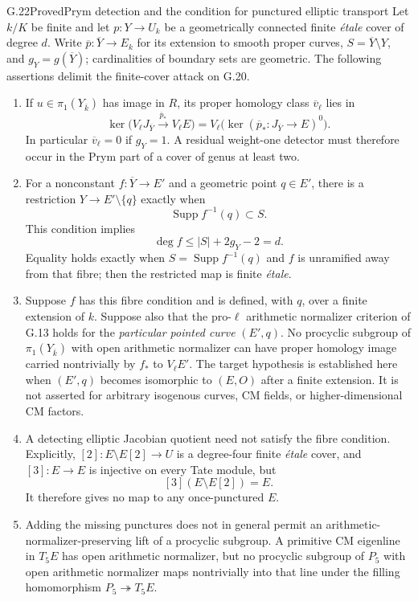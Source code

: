 \begin{statement}{G.22}{Proved}{Prym detection and the condition for punctured elliptic transport}
Let $k/K$ be finite and let $p:Y\to U_k$ be a geometrically
connected finite \emph{\'etale} cover of degree $d$. Write
$\overline p:\overline Y\to E_k$ for its extension to smooth
proper curves, $S=\overline Y\setminus Y$, and
$g_Y=g(\overline Y)$; cardinalities of boundary sets are geometric.
The following assertions delimit the finite-cover attack on G.20.
\begin{enumerate}
\item If $u\in\pi_1(Y_{\overline k})$ has image in $R$, its
proper homology class $\overline v_\ell$ lies in
\[
 \ker\bigl(V_\ell J_{\overline Y}
              \xrightarrow{\overline p_*}V_\ell E\bigr)
       =V_\ell\bigl(\ker(\overline p_*:J_{\overline Y}\to E)^0\bigr).
\]
In particular $\overline v_\ell=0$ if $g_Y=1$. A residual
weight-one detector must therefore occur in the Prym part of a
cover of genus at least two.
\item For a nonconstant $f:\overline Y\to E'$ and a geometric
point $q\in E'$, there is a restriction
$Y\to E'\setminus\{q\}$ exactly when
\[
                    \operatorname{Supp}f^{-1}(q)\subset S.
\]
This condition implies
\[
                 \deg f\le |S|+2g_Y-2=d.
\]
Equality holds exactly when $S=\operatorname{Supp}f^{-1}(q)$
and $f$ is unramified away from that fibre; then the restricted
map is finite \emph{\'etale}.
\item Suppose $f$ has this fibre condition and is defined, with
$q$, over a finite extension of $k$. Suppose also that the
pro-$\ell$ arithmetic normalizer criterion of G.13 holds for
the \emph{particular pointed curve} $(E',q)$. No procyclic
subgroup of $\pi_1(Y_{\overline k})$ with open arithmetic
normalizer can have proper homology image carried nontrivially
by $f_*$ to $V_\ell E'$. The target hypothesis is established
here when $(E',q)$ becomes isomorphic to $(E,O)$ after a finite
extension. It is not asserted for arbitrary isogenous curves,
CM fields, or higher-dimensional CM factors.
\item A detecting elliptic Jacobian quotient need not satisfy
the fibre condition. Explicitly, $[2]:E\setminus E[2]\to U$
is a degree-four finite \emph{\'etale} cover, and
$[3]:E\to E$ is injective on every Tate module, but
\[
                      [3](E\setminus E[2])=E.
\]
It therefore gives no map to any once-punctured $E$.
\item Adding the missing punctures does not in general permit
an arithmetic-normalizer-preserving lift of a procyclic subgroup.
A primitive CM eigenline in $T_5E$ has open arithmetic normalizer,
but no procyclic subgroup of $P_5$ with open arithmetic normalizer
maps nontrivially into that line under the filling homomorphism
$P_5\twoheadrightarrow T_5E$.
\end{enumerate}
\end{statement}
